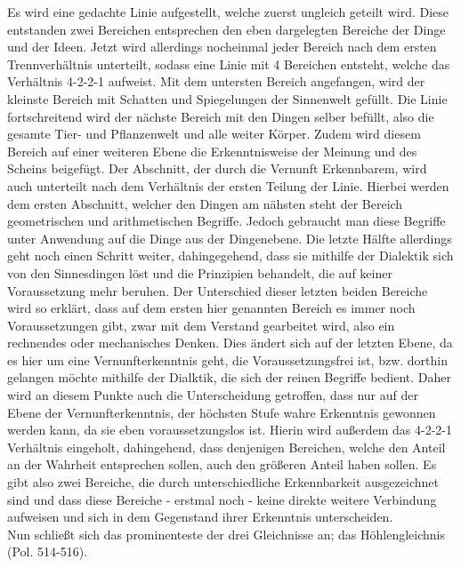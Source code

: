 Es wird eine gedachte Linie aufgestellt, welche zuerst ungleich geteilt wird. Diese entstanden zwei Bereichen entsprechen den  eben dargelegten Bereiche der Dinge und der Ideen. Jetzt wird allerdings nocheinmal jeder Bereich nach dem ersten Trennverhältnis unterteilt, sodass eine Linie mit 4 Bereichen entsteht, welche das Verhältnis 4-2-2-1 aufweist. Mit dem untersten Bereich angefangen, wird der kleinste Bereich mit Schatten und Spiegelungen der Sinnenwelt gefüllt. Die Linie fortschreitend wird der nächste Bereich mit den Dingen selber befüllt, also die gesamte Tier- und Pflanzenwelt und alle weiter Körper. Zudem wird diesem Bereich auf einer weiteren Ebene die Erkenntnisweise der Meinung und des Scheins beigefügt. Der Abschnitt, der durch die Vernunft Erkennbarem, wird auch unterteilt nach dem Verhältnis der ersten Teilung der Linie. Hierbei werden dem ersten Abschnitt, welcher den Dingen am nähsten steht der Bereich geometrischen und arithmetischen Begriffe. Jedoch gebraucht man diese Begriffe unter Anwendung auf die Dinge aus der Dingenebene. Die letzte Hälfte allerdings geht noch einen Schritt weiter, dahingegehend, dass sie mithilfe der Dialektik sich von den Sinnesdingen löst und die Prinzipien behandelt, die auf keiner Voraussetzung mehr beruhen. Der Unterschied dieser letzten beiden Bereiche wird so erklärt, dass auf dem ersten hier genannten Bereich es immer noch Voraussetzungen gibt, zwar mit dem Verstand gearbeitet wird, also ein rechnendes oder mechanisches Denken. Dies ändert sich auf der letzten Ebene, da es hier um eine Vernunfterkenntnis geht, die Voraussetzungsfrei ist, bzw. dorthin gelangen möchte mithilfe der Dialktik, die sich der reinen Begriffe bedient. 
Daher wird an diesem Punkte auch die Unterscheidung getroffen, dass nur auf der Ebene der Vernunfterkenntnis, der höchsten Stufe wahre Erkenntnis gewonnen werden kann, da sie eben voraussetzungslos ist. Hierin wird außerdem das 4-2-2-1 Verhältnis eingeholt, dahingehend, dass denjenigen Bereichen, welche den Anteil an der Wahrheit entsprechen sollen, auch den größeren Anteil haben sollen.
Es gibt also zwei Bereiche, die durch unterschiedliche Erkennbarkeit ausgezeichnet sind und dass diese Bereiche - erstmal noch - keine direkte weitere Verbindung aufweisen und sich in dem Gegenstand ihrer Erkenntnis unterscheiden.\\
Nun schließt sich das prominenteste der drei Gleichnisse an; das Höhlengleichnis (Pol. 514-516).
